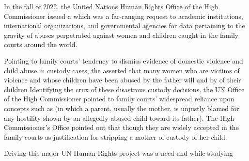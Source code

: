 




\noindent{}In the fall of 2022, the United Nations Human Rights Office of the
High Commissioner issued a  which was a far-ranging 
request to academic institutions, international organizations, 
and governmental agencies for data pertaining to the gravity of abuses perpetrated
against women and children caught in the family courts around the
world. \pfl{}


Pointing to family courts' tendency to dismiss evidence of domestic
violence and child abuse in custody cases, the  asserted
that many women who are victims of violence and whose children have
been abused by the father will  and by  of their children
 Identifying the crux of these
disastrous custody decisions, the UN Office of the High Commissioner
pointed to family courts' widespread reliance upon concepts such as
 (in which a parent, usually the mother, 
is unjustly blamed for any hostility shown by an allegedly abused child toward its
father). The High Commissioner's Office
pointed out that though  they are widely accepted in the family courts as 
justification for stripping a mother of custody of her child. \pfl{}

Driving this major UN Human Rights project was a need  and  while studying  \pfl{}

